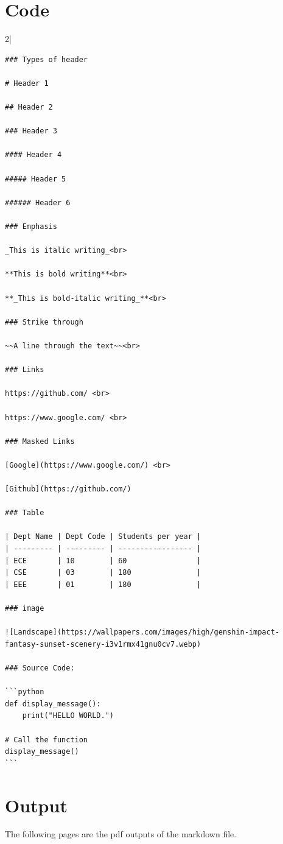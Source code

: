 \documentclass[12pt]{article}
\begin{document}
\section*{Code}
\begin{multicols}{2}{|}
    \begin{verbatim}
### Types of header

# Header 1

## Header 2

### Header 3

#### Header 4

##### Header 5

###### Header 6

### Emphasis

_This is italic writing_<br>

**This is bold writing**<br>

**_This is bold-italic writing_**<br>

### Strike through

~~A line through the text~~<br>

### Links

https://github.com/ <br>

https://www.google.com/ <br>

### Masked Links

[Google](https://www.google.com/) <br>

[Github](https://github.com/)

### Table

| Dept Name | Dept Code | Students per year |
| --------- | --------- | ----------------- |
| ECE       | 10        | 60                |
| CSE       | 03        | 180               |
| EEE       | 01        | 180               |

### image

![Landscape](https://wallpapers.com/images/high/genshin-impact-fantasy-sunset-scenery-i3v1rmx41gnu0cv7.webp)

### Source Code:

```python
def display_message():
    print("HELLO WORLD.")

# Call the function
display_message()
```    
\end{verbatim}
\end{multicols}

\section*{Output}
The following pages are the pdf outputs of the markdown file.


% 
% 
\end{document}

